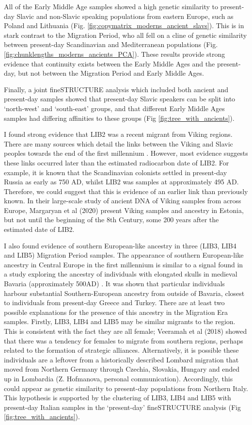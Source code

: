 All of the Early Middle Age samples showed a high genetic similarity to present-day Slavic and non-Slavic speaking populations from eastern Europe, such as Poland and Lithuania (Fig. \ref{fig:copymatrix_moderns_ancient_slavs}). This is in stark contrast to the Migration Period, who all fell on a cline of genetic similarity between present-day Scandinavian and Mediterranean populations (Fig. \ref{fig:chunklengths_moderns_ancients_PCA}). These results provide strong evidence that continuity exists between the Early Middle Ages and the present-day, but not between the Migration Period and Early Middle Ages.

Finally, a joint fineSTRUCTURE analysis which included both ancient and present-day samples showed that present-day Slavic speakers can be split into  `north-west' and `south-east' groups, and that different Early Middle Ages samples had differing affinities to these groups (Fig \ref{fig:tree_with_ancients}). 

I found strong evidence that LIB2 was a recent migrant from Viking regions. There are many sources which detail the links between the Viking and Slavic peoples towards the end of the first millennium \cite{duczko2004viking, peterson2016vikings}. However, most evidence suggests these links occurred later than the estimated radiocarbon date of LIB2. For example, it is known that the Scandinavian colonists settled in present-day Russia as early as 750 AD, whilst LIB2 was samples at approximately 495 AD. Therefore, we could suggest that this is evidence of an earlier link than previously known. In their large-scale study of ancient DNA of Viking samples from across Europe, Margaryan et al (2020) present Viking samples and ancestry in Estonia, but not until the beginning of the 8th Century, some 200 years after the estimated date of LIB2.  

I also found evidence of southern European-like ancestry in three (LIB3, LIB4 and LIB5) Migration Period samples. The appearance of southern European-like ancestry in Central Europe in the first millennium is similar to a signal found in a study exploring the ancestry of individuals with elongated skulls in medieval Bavaria (approximately 500AD) \cite{Veeramah2018}. It was shown that particular individuals harbour substantial Southern-European ancestry from outside of Bavaria, closest to individuals from present-day Greece and Turkey. There are at least two possible explanations for the presence of this ancestry in the Migration Era samples. Firstly, LIB3, LIB4 and LIB5 may be similar migrants to the region. This is consistent with the fact they are all female; Veeramah et al (2018) showed that there was a tendency for females to migrate from southern regions, perhaps related to the formation of strategic alliances. Alternatively, it is possible these individuals are a leftover from a historically described Lombard migration that moved from Northern Germany through Czechia, Slovakia, Hungary and ended up in Lombardia (Z. Hofmanova, personal communication). Accordingly, this could appear as genetic similarity to present-day populations from Northern Italy. This hypothesis is supported by the clustering of LIB3, LIB4 and LIB5 with present-day Italian samples in the `present-day' fineSTRUCTURE analysis (Fig \ref{fig:tree_with_ancients}).

